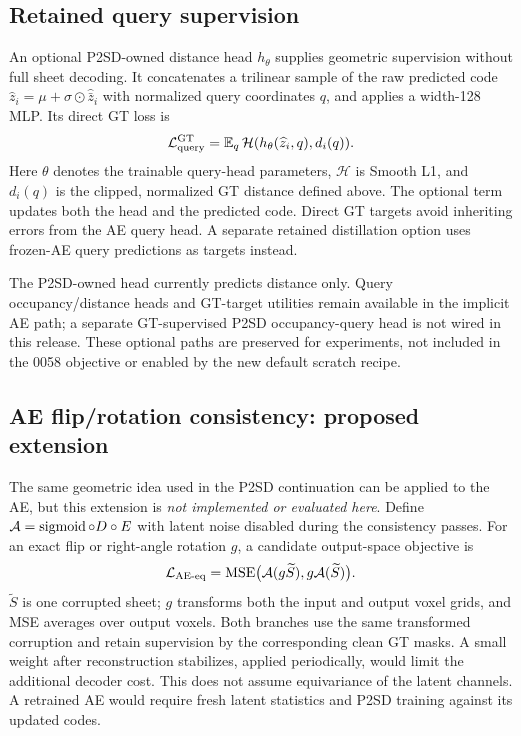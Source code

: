 \subsection{Retained query supervision}
\label{supp:query}
An optional P2SD-owned distance head $h_\theta$ supplies geometric supervision
without full sheet decoding. It concatenates a trilinear sample of the raw
predicted code $\widehat z_i=\mu+\sigma\odot\widehat{\bar z}_i$ with normalized
query coordinates $q$, and applies a width-128 MLP. Its direct GT loss is
\begin{equation}
 \mathcal L_{\rm query}^{\rm GT}
 =\mathbb E_q\,\mathcal H(h_\theta(\widehat z_i,q),d_i(q)).
 \label{eq:gtquery}
\end{equation}
Here $\theta$ denotes the trainable query-head parameters, $\mathcal H$ is
Smooth L1, and $d_i(q)$ is the clipped, normalized GT distance defined above.
The optional term updates both the head and the predicted code. Direct GT
targets avoid inheriting errors from the AE query head. A separate retained
distillation option uses frozen-AE query predictions as targets instead.

The P2SD-owned head currently predicts distance only. Query occupancy/distance
heads and GT-target utilities remain available in the implicit AE path; a
separate GT-supervised P2SD occupancy-query head is not wired in this release.
These optional paths are preserved for experiments, not included in the
0058 objective or enabled by the new default scratch recipe.

\subsection{AE flip/rotation consistency: proposed extension}
\label{supp:aeconsistency}
The same geometric idea used in the P2SD continuation can be applied to the
AE, but this extension is \emph{not implemented or evaluated here}. Define
$\mathcal A=\operatorname{sigmoid}\circ D\circ E$ with latent noise disabled during the
consistency passes. For an exact flip or right-angle rotation $g$, a candidate
output-space objective is
\begin{equation}
 \mathcal L_{\rm AE\text{-}eq}
 =\operatorname{MSE}\bigl(\mathcal A(g\widetilde S),g\mathcal A(\widetilde S)\bigr).
 \label{eq:aeequivariance}
\end{equation}
$\widetilde S$ is one corrupted sheet; $g$ transforms both the input and output
voxel grids, and MSE averages over output voxels. Both branches use the same
transformed corruption and retain supervision by the corresponding clean
GT masks. A small weight after reconstruction stabilizes, applied periodically,
would limit the additional decoder cost. This does not assume equivariance of
the latent channels. A retrained AE would require fresh latent statistics
and P2SD training against its updated codes.
